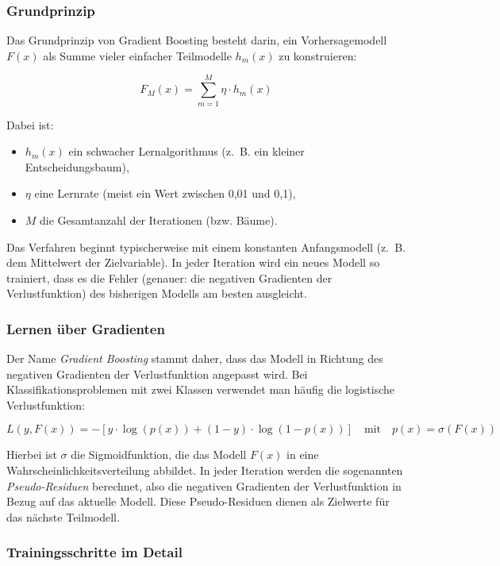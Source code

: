 \documentclass[10pt]{scrartcl}
\begin{document}
\subsubsection{Grundprinzip}

Das Grundprinzip von Gradient Boosting besteht darin, ein Vorhersagemodell $F(x)$ als Summe vieler einfacher Teilmodelle $h_m(x)$ zu konstruieren:

\[
F_M(x) = \sum_{m=1}^{M} \eta \cdot h_m(x)
\]

Dabei ist:
\begin{itemize}
    \item $h_m(x)$ ein schwacher Lernalgorithmus (z.~B. ein kleiner Entscheidungsbaum),
    \item $\eta$ eine Lernrate (meist ein Wert zwischen 0{,}01 und 0{,}1),
    \item $M$ die Gesamtanzahl der Iterationen (bzw. Bäume).
\end{itemize}

Das Verfahren beginnt typischerweise mit einem konstanten Anfangsmodell (z.~B. dem Mittelwert der Zielvariable). In jeder Iteration wird ein neues Modell so trainiert, dass es die Fehler (genauer: die negativen Gradienten der Verlustfunktion) des bisherigen Modells am besten ausgleicht.

\subsubsection{Lernen über Gradienten}

Der Name \textit{Gradient Boosting} stammt daher, dass das Modell in Richtung des negativen Gradienten der Verlustfunktion angepasst wird. Bei Klassifikationsproblemen mit zwei Klassen verwendet man häufig die logistische Verlustfunktion:

\[
L(y, F(x)) = - \left[ y \cdot \log(p(x)) + (1 - y) \cdot \log(1 - p(x)) \right]
\quad \text{mit} \quad p(x) = \sigma(F(x))
\]

Hierbei ist $\sigma$ die Sigmoidfunktion, die das Modell $F(x)$ in eine Wahrscheinlichkeitsverteilung abbildet. In jeder Iteration werden die sogenannten \emph{Pseudo-Residuen} berechnet, also die negativen Gradienten der Verlustfunktion in Bezug auf das aktuelle Modell. Diese Pseudo-Residuen dienen als Zielwerte für das nächste Teilmodell.

\subsubsection{Trainingsschritte im Detail}
\end{document}
